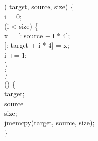 %
  (  target,   source,   size) \{\\
  i = 0;\\
  (i < size) \{\\
  x = [: source + i * 4];\\
[: target + i * 4] = x;\\
i += 1;\\
\}\\
\}\\
  () \{\\
  target;\\
  source;\\
  size;\\
jmemcpy(target, source, size);\\
\}
